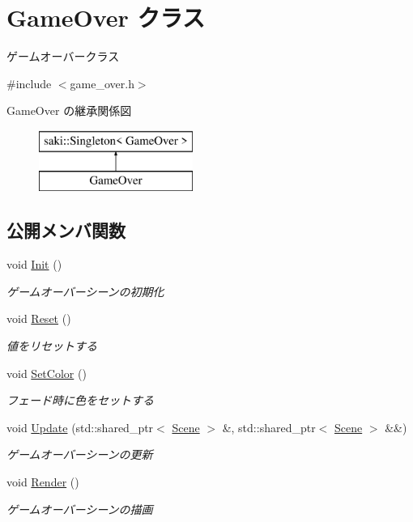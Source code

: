 \hypertarget{class_game_over}{}\section{Game\+Over クラス}
\label{class_game_over}


ゲームオーバークラス  




{\ttfamily \#include $<$game\+\_\+over.\+h$>$}

Game\+Over の継承関係図\begin{figure}[H]
\begin{center}
\leavevmode
\includegraphics[height=2.000000cm]{class_game_over}
\end{center}
\end{figure}
\subsection*{公開メンバ関数}
\begin{DoxyCompactItemize}
\item 
void \mbox{\hyperlink{class_game_over_ac13d1bd0fe9f8db0ef0301c9ec63a9e0}{Init}} ()
\begin{DoxyCompactList}\small\item\em ゲームオーバーシーンの初期化 \end{DoxyCompactList}\item 
void \mbox{\hyperlink{class_game_over_afed8423e1fc3b76ba826b9c376913df9}{Reset}} ()
\begin{DoxyCompactList}\small\item\em 値をリセットする \end{DoxyCompactList}\item 
void \mbox{\hyperlink{class_game_over_ab5d86cf67969620b78fb6f978802daca}{Set\+Color}} ()
\begin{DoxyCompactList}\small\item\em フェード時に色をセットする \end{DoxyCompactList}\item 
void \mbox{\hyperlink{class_game_over_a13dd856f7d38020ad388cacda5fef575}{Update}} (std\+::shared\+\_\+ptr$<$ \mbox{\hyperlink{class_scene}{Scene}} $>$ \&, std\+::shared\+\_\+ptr$<$ \mbox{\hyperlink{class_scene}{Scene}} $>$ \&\&)
\begin{DoxyCompactList}\small\item\em ゲームオーバーシーンの更新 \end{DoxyCompactList}\item 
void \mbox{\hyperlink{class_game_over_ae16a875f25d87d8d368f24db4137f4c1}{Render}} ()
\begin{DoxyCompactList}\small\item\em ゲームオーバーシーンの描画 \end{DoxyCompactList}\end{DoxyCompactItemize}
